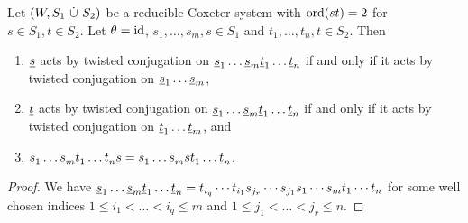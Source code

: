 \begin{lemm}
	Let $(W, S_1 \ \dot \cup \  S_2)$ be a reducible Coxeter system with $\operatorname{ord}(st) = 2$ for $s \in S_1, t \in S_2$. Let $\theta = \operatorname{id}$, $s_1,\ldots,s_m,s \in S_1$ and $t_1,\ldots,t_n,t \in S_2$. Then

	\begin{enumerate}
		\item $\underline{s}$ acts by twisted conjugation on $\underline{s}_1 \ldots \underline{s}_m \underline{t}_1 \ldots \underline{t}_n$ if and only if it acts by twisted conjugation on $\underline{s}_1 \ldots \underline{s}_m$,
		\item $\underline{t}$ acts by twisted conjugation on $\underline{s}_1 \ldots \underline{s}_m \underline{t}_1 \ldots \underline{t}_n$ if and only if it acts by twisted conjugation on $\underline{t}_1 \ldots \underline{t}_m$, and
		\item $\underline{s}_1 \ldots \underline{s}_m \underline{t}_1 \ldots \underline{t}_n \underline{s} = \underline{s}_1 \ldots \underline{s}_m \underline{s} \underline{t}_1 \ldots \underline{t}_n$.
	\end{enumerate}

	\begin{proof}
		We have $\underline{s}_1 \ldots \underline{s}_m \underline{t}_1 \ldots \underline{t}_n = t_{i_q} \cdots t_{i_1} s_{j_r} \cdots s_{j_1} s_1 \cdots s_m t_1 \cdots t_n$ for some well chosen indices $1 \leq i_1 < \ldots < i_q \leq m$ and $1 \leq j_1 < \ldots < j_r \leq n$.


\end{proof}
\end{lemm}
